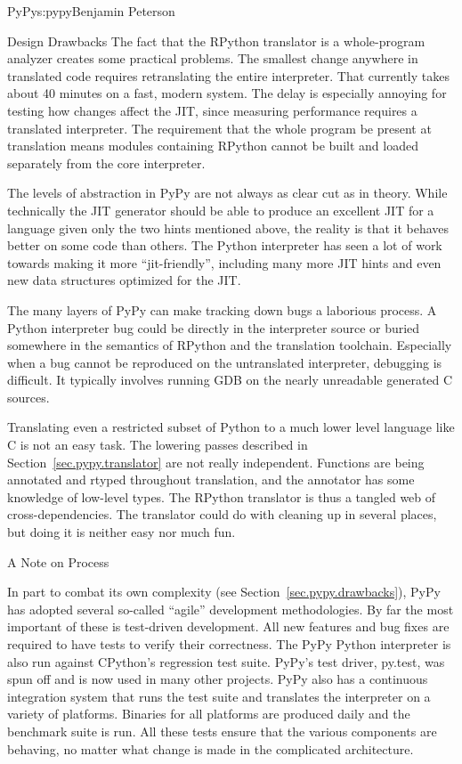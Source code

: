 \begin{aosachapter}{PyPy}{s:pypy}{Benjamin Peterson}
\begin{aosasect1}{Design Drawbacks}
The fact that the RPython translator is a whole-program analyzer creates some
practical problems. The smallest change anywhere in translated code requires
retranslating the entire interpreter. That currently takes about 40 minutes on a
fast, modern system. The delay is especially annoying for testing how changes
affect the JIT, since measuring performance requires a translated
interpreter. The requirement that the whole program be present at translation
means modules containing RPython cannot be built and loaded separately from the
core interpreter.

The levels of abstraction in PyPy are not always as clear cut as in
theory. While technically the JIT generator should be able to produce an
excellent JIT for a language given only the two hints mentioned above, the
reality is that it behaves better on some code than others. The Python
interpreter has seen a lot of work towards making it more ``jit-friendly'',
including many more JIT hints and even new data structures optimized for the
JIT.

The many layers of PyPy can make tracking down bugs a laborious process. A
Python interpreter bug could be directly in the interpreter source or buried
somewhere in the semantics of RPython and the translation toolchain. Especially
when a bug cannot be reproduced on the untranslated interpreter, debugging is
difficult. It typically involves running GDB on the nearly unreadable generated
C sources.

Translating even a restricted subset of Python to a much lower level language
like C is not an easy task. The lowering passes described in
Section~\ref{sec.pypy.translator} are not really independent. Functions are being
annotated and rtyped throughout translation, and the annotator has some
knowledge of low-level types. The RPython translator is thus a tangled web of
cross-dependencies. The translator could do with cleaning up in several places,
but doing it is neither easy nor much fun.

\end{aosasect1}

\begin{aosasect1}{A Note on Process}

In part to combat its own complexity (see Section~\ref{sec.pypy.drawbacks}), PyPy
has adopted several so-called ``agile'' development methodologies. By far the
most important of these is test-driven development. All new features and bug
fixes are required to have tests to verify their correctness. The PyPy Python
interpreter is also run against CPython's regression test suite. PyPy's test
driver, py.test, was spun off and is now used in many other projects. PyPy also
has a continuous integration system that runs the test suite and translates the
interpreter on a variety of platforms. Binaries for all platforms are produced
daily and the benchmark suite is run. All these tests ensure that the various
components are behaving, no matter what change is made in the complicated
architecture.


\end{aosasect1}
\end{aosachapter}

